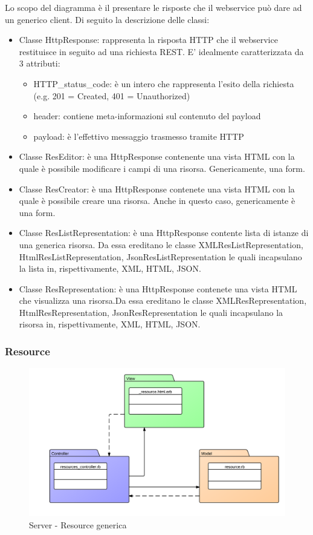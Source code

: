 Lo scopo del diagramma è il presentare le risposte che il webservice può dare ad un generico client. Di seguito la descrizione delle classi:

\begin{itemize}
\item Classe HttpResponse: rappresenta la risposta HTTP che il webservice restituisce in seguito ad una richiesta REST. E' idealmente caratterizzata da 3 attributi:
\begin{itemize}
\item HTTP\_status\_code: è un intero che rappresenta l'esito della richiesta (e.g. 201 = Created, 401 = Unauthorized)
\item header: contiene meta-informazioni sul contenuto del payload
\item payload: è l'effettivo messaggio trasmesso tramite HTTP 
\end{itemize}
\item Classe ResEditor: è una HttpResponse contenente una vista HTML con la quale è possibile modificare i campi di una risorsa. Genericamente, una form.
\item Classe ResCreator: è una HttpResponse contenete una vista HTML con la quale è possibile creare una risorsa. Anche in questo caso, genericamente è una form.
\item Classe ResListRepresentation:  è una HttpResponse contente lista di istanze di una generica risorsa. Da essa ereditano le classe XMLResListRepresentation, HtmlResListRepresentation, JsonResListRepresentation le quali incapsulano la lista in, rispettivamente, XML, HTML, JSON.
\item Classe ResRepresentation: è una HttpResponse contenete una vista HTML che visualizza una risorsa.Da essa ereditano le classe XMLResRepresentation, HtmlResRepresentation, JsonResRepresentation le quali incapsulano la risorsa in, rispettivamente, XML, HTML, JSON.
\end{itemize}

\subsubsection{Resource}
\label{resource}

\begin{figure}[H]
\centering
\includegraphics[scale=0.70]{images/cap2/Server/MvcResource.png}
\caption{Server - Resource generica}
\end{figure}

